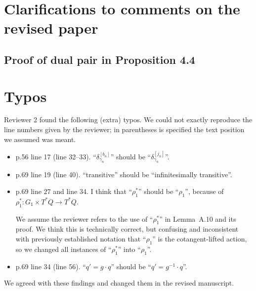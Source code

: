 \documentclass{article}
\begin{document}
\section{Clarifications to comments on the revised paper}

\subsection{Proof of dual pair in Proposition 4.4}


\section{Typos}
Reviewer 2 found the following (extra) typos. We could not exactly
reproduce the line numbers given by the reviewer; in parentheses is
specified the text position we assumed was meant.
\begin{itemize}
\item p.56 line 17 (line 32--33). ``$\delta_{\gamma_n}^{[b_n]}$'' should be ``$\delta_{\gamma_n}^{[j_n]}$''.
\item p.69 line 19 (line 40). ``transitive'' should be ``infinitesimally transitive''.
\item p.69 line 27 and line 34. I think that ``$\rho_1^*$'' should be
  ``$\rho_1$'', because of $\rho_1^*: G_1 \times T^*Q \to T^*Q$.

  We assume the reviewer refers to the use of ``$\rho_1^*$'' in
  Lemma~A.10 and its proof. We think this is technically correct, but
  confusing and inconsistent with previously established notation that
  ``$\rho_1$'' is the cotangent-lifted action, so we changed all
  instances of ``$\rho_1^*$'' into ``$\rho_1$''.
\item p.69 line 34 (line 56). ``$q' = g \cdot q$'' should be ``$q' = g^{-1} \cdot q$''.
\end{itemize}

\noindent
We agreed with these findings and changed them in the revised manuscript.
\end{document}
